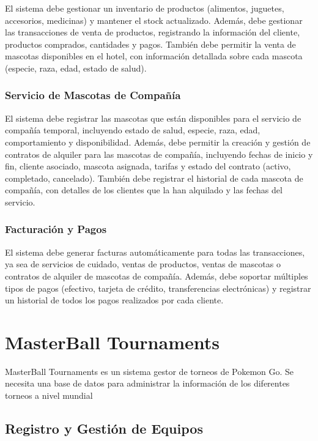 \documentclass[
  letterpaper,
  DIV=11,
  numbers=noendperiod]{scrreprt}
\begin{document}
El sistema debe gestionar un inventario de productos (alimentos,
juguetes, accesorios, medicinas) y mantener el stock actualizado.
Además, debe gestionar las transacciones de venta de productos,
registrando la información del cliente, productos comprados, cantidades
y pagos. También debe permitir la venta de mascotas disponibles en el
hotel, con información detallada sobre cada mascota (especie, raza,
edad, estado de salud).

\subsection{Servicio de Mascotas de
Compañía}\label{servicio-de-mascotas-de-compauxf1uxeda}

El sistema debe registrar las mascotas que están disponibles para el
servicio de compañía temporal, incluyendo estado de salud, especie,
raza, edad, comportamiento y disponibilidad. Además, debe permitir la
creación y gestión de contratos de alquiler para las mascotas de
compañía, incluyendo fechas de inicio y fin, cliente asociado, mascota
asignada, tarifas y estado del contrato (activo, completado, cancelado).
También debe registrar el historial de cada mascota de compañía, con
detalles de los clientes que la han alquilado y las fechas del servicio.

\subsection{Facturación y Pagos}\label{facturaciuxf3n-y-pagos}

El sistema debe generar facturas automáticamente para todas las
transacciones, ya sea de servicios de cuidado, ventas de productos,
ventas de mascotas o contratos de alquiler de mascotas de compañía.
Además, debe soportar múltiples tipos de pagos (efectivo, tarjeta de
crédito, transferencias electrónicas) y registrar un historial de todos
los pagos realizados por cada cliente.


\chapter{MasterBall Tournaments}\label{masterball-tournaments}

MasterBall Tournaments es un sistema gestor de torneos de Pokemon Go. Se
necesita una base de datos para administrar la información de los
diferentes torneos a nivel mundial

\section{Registro y Gestión de
Equipos}\label{registro-y-gestiuxf3n-de-equipos}
\end{document}
